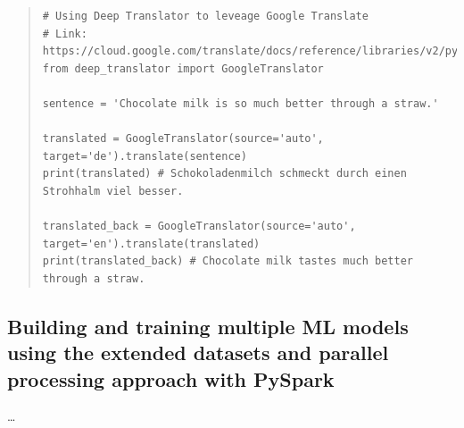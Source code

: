 \documentclass[11pt]{article}
\begin{document}
\begin{quote}
\begin{verbatim}
# Using Deep Translator to leveage Google Translate
# Link: https://cloud.google.com/translate/docs/reference/libraries/v2/python
from deep_translator import GoogleTranslator

sentence = 'Chocolate milk is so much better through a straw.'

translated = GoogleTranslator(source='auto', target='de').translate(sentence)
print(translated) # Schokoladenmilch schmeckt durch einen Strohhalm viel besser.

translated_back = GoogleTranslator(source='auto', target='en').translate(translated)
print(translated_back) # Chocolate milk tastes much better through a straw.
\end{verbatim}
\end{quote}


\subsection{Building and training multiple ML models using the extended datasets and parallel processing approach with PySpark}
\ldots
\end{document}
